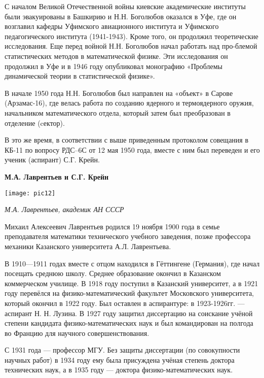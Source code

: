С началом Великой Отечественной войны киевские академические институты были эвакуированы в Башкирию и Н.Н. Боголюбов оказался в Уфе, где он возглавил кафедры Уфимского авиационного института и Уфимского педагогического института (1941-1943). Кроме того, он продолжил теоретические исследования. Еще перед войной Н.Н. Боголюбов начал работать над про-блемой статистических методов в математической физике. Эти исследования он продолжил в Уфе и в 1946 году опубликовал монографию «Проблемы динамической теории в статистической физике».

В начале 1950 года Н.Н. Боголюбов был направлен на «объект» в Сарове (Арзамас-16), где велась работа по созданию ядерного и термоядерного оружия, начальником математического отдела, который затем был преобразован в отделение (cектор).

В это же время, в соответствии с выше приведенным протоколом совещания в КБ-11 по вопросу РДС–6С от 12 мая 1950 года, вместе с ним был переведен и его ученик (аспирант) С.Г. Крейн.

\begin{center}
{\bf М.А. Лаврентьев и С.Г. Крейн}

\vspace{3mm}

\texttt{[image: pic12]}


{\it М.А. Лаврентьев, академик АН СССР}
\end{center}

Михаил Алексеевич Лаврентьев родился 19 ноября 1900 года в семье преподавателя математики технического учебного заведения, позже профессора механики Казанского университета А.Л. Лаврентьева.

В 1910—1911 годах вместе с отцом находился в Гёттингене (Германия), где начал посещать среднюю школу. Среднее образование окончил в Казанском коммерческом училище. В 1918 году поступил в Казанский университет, а в 1921 году перевёлся на физико-математический факультет Московского университета, который окончил в 1922 году. Был оставлен в аспирантуре: в 1923-1926гг. — аспирант Н. Н. Лузина. В 1927 году защитил диссертацию на соискание учёной степени кандидата физико-математических наук и был командирован на полгода во Францию для научного совершенствования.

С 1931 года — профессор МГУ. Без защиты диссертации (по совокупности научных работ) в 1934 году ему была присуждена учёная степень доктора технических наук, а в 1935 году — доктора физико-математических наук.


